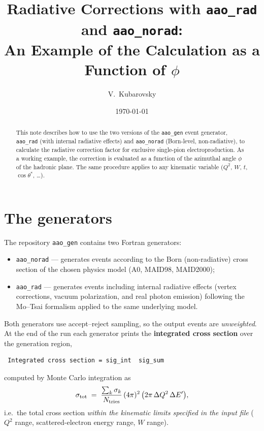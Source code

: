 \documentclass[11pt]{article}
\title{Radiative Corrections with \texttt{aao\_rad} and \texttt{aao\_norad}:\\
An Example of the Calculation as a Function of $\phi$}
\author{V.~Kubarovsky}
\date{\today}
\begin{document}
\maketitle

\begin{abstract}
This note describes how to use the two versions of the \texttt{aao\_gen}
event generator, \texttt{aao\_rad} (with internal radiative effects) and
\texttt{aao\_norad} (Born-level, non-radiative), to calculate the radiative
correction factor for exclusive single-pion electroproduction. As a working
example, the correction is evaluated as a function of the azimuthal angle
$\phi$ of the hadronic plane. The same procedure applies to any kinematic
variable ($Q^2$, $W$, $t$, $\cos\theta^*$, \dots).
\end{abstract}

\section{The generators}

The repository \texttt{aao\_gen} contains two Fortran generators:
\begin{itemize}
  \item \texttt{aao\_norad} --- generates events according to the Born
        (non-radiative) cross section of the chosen physics model
        (A0, MAID98, MAID2000);
  \item \texttt{aao\_rad} --- generates events including internal radiative
        effects (vertex corrections, vacuum polarization, and real photon
        emission) following the Mo--Tsai formalism applied to the same
        underlying model.
\end{itemize}

Both generators use accept--reject sampling, so the output events are
\emph{unweighted}. At the end of the run each generator prints the
\textbf{integrated cross section} over the generation region,
\begin{lstlisting}
 Integrated cross section = sig_int  sig_sum
\end{lstlisting}
computed by Monte Carlo integration as
\begin{equation}
  \sigma_{\rm tot} \;=\;
  \frac{\sum_k \sigma_k}{N_{\rm tries}}\,(4\pi)^2\,
  \bigl(2\pi\,\Delta Q^2\,\Delta E'\bigr),
\end{equation}
i.e.\ the total cross section \emph{within the kinematic limits specified in
the input file} ($Q^2$ range, scattered-electron energy range, $W$ range).
\end{document}
